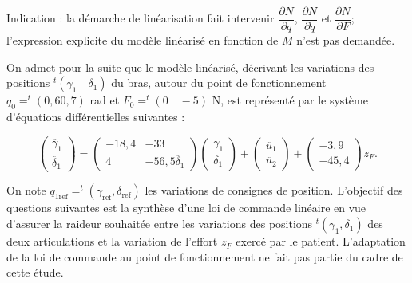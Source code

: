\begin{multicols}{2}
Indication : la démarche de linéarisation fait intervenir $\dfrac{\partial N}{\partial q}$, $\dfrac{\partial N}{\partial \dot{q}}$ et $\dfrac{\partial N}{\partial F}$; l’expression explicite du modèle linéarisé
en fonction de $M$ n’est pas demandée.


On admet pour la suite que le modèle linéarisé, décrivant les variations des positions $ ^t\left(\gamma_1 \quad \delta_1 \right)$ du bras, autour du point de fonctionnement $q_0 = ^t\left(0,6 0,7\right)$ rad et $F_0 = ^t\left(0 \quad -5\right)$ N, est représenté par le système d’équations différentielles suivantes :


$$
\begin{pmatrix}
\ddot{\gamma_1} \\
\ddot{\delta_1}
\end{pmatrix}
=
\begin{pmatrix}
-18,4 & -33 \\
4 & -56,5
\ddot{\delta_1}
\end{pmatrix}
\begin{pmatrix}
{\gamma_1} \\
{\delta_1}
\end{pmatrix}
+
\begin{pmatrix}
\ddot{u_1} \\
\ddot{u_2}
\end{pmatrix}
+
\begin{pmatrix}
-3,9 \\
-45,4
\end{pmatrix}
z_F.
$$

On note $q_{1\text{ref}} = ^t\left(\gamma_{\text{ref}}, \delta_{\text{ref}} \right)$ les variations de consignes de position. L’objectif des questions suivantes est la
synthèse d’une loi de commande linéaire en vue d’assurer la raideur souhaitée entre les variations des positions  $ ^t\left(\gamma_{1}, \delta_{1} \right)$ des deux articulations et la variation de l’effort $z_F$ exercé par le patient. L’adaptation de la loi de
commande au point de fonctionnement ne fait pas partie du cadre de cette étude.




\ifprof
\begin{corrige}
\end{corrige}
\else
\fi



\end{multicols}

